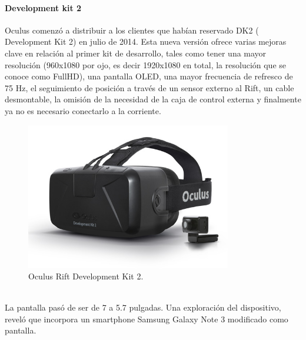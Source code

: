 \documentclass[12pt]{article}
\begin{document}
\paragraph{Development kit 2}
Oculus comenzó a distribuir a los clientes que habían reservado DK2 ( Development Kit 2) en julio de 2014. Esta nueva versión ofrece varias mejoras clave en relación al primer kit de desarrollo, tales como tener una mayor resolución (960x1080 por ojo, es decir 1920x1080 en total, la resolución que se conoce como FullHD), una pantalla OLED, una mayor frecuencia de refresco de 75 Hz, el seguimiento de posición a través de un sensor externo al Rift, un cable desmontable,  la omisión de la necesidad de la caja de control externa y finalmente ya no es necesario conectarlo a la corriente.
\begin{figure}[h!]
\includegraphics[width=0.8\textwidth,center]{dk2.jpg}
\caption{Oculus Rift Development Kit 2.}
\end{figure}
\\La pantalla pasó de ser de 7 a 5.7 pulgadas. Una exploración del dispositivo, reveló que incorpora un smartphone Samsung Galaxy Note 3 modificado como pantalla.
\end{document}
